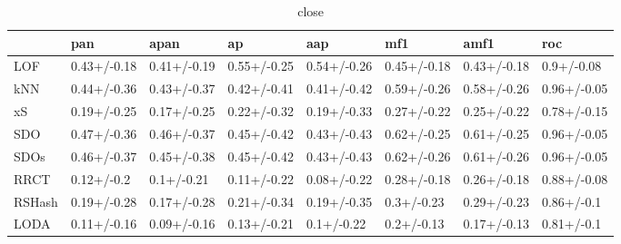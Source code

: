 \begin{table}
\centering
\caption{close}
\begin{tabular}{llllllll}
\toprule
{} &          pan &         apan &           ap &          aap &          mf1 &         amf1 &          roc \\
\midrule
LOF    &  0.43+/-0.18 &  0.41+/-0.19 &  0.55+/-0.25 &  0.54+/-0.26 &  0.45+/-0.18 &  0.43+/-0.18 &   0.9+/-0.08 \\
kNN    &  0.44+/-0.36 &  0.43+/-0.37 &  0.42+/-0.41 &  0.41+/-0.42 &  0.59+/-0.26 &  0.58+/-0.26 &  0.96+/-0.05 \\
xS     &  0.19+/-0.25 &  0.17+/-0.25 &  0.22+/-0.32 &  0.19+/-0.33 &  0.27+/-0.22 &  0.25+/-0.22 &  0.78+/-0.15 \\
SDO    &  0.47+/-0.36 &  0.46+/-0.37 &  0.45+/-0.42 &  0.43+/-0.43 &  0.62+/-0.25 &  0.61+/-0.25 &  0.96+/-0.05 \\
SDOs   &  0.46+/-0.37 &  0.45+/-0.38 &  0.45+/-0.42 &  0.43+/-0.43 &  0.62+/-0.26 &  0.61+/-0.26 &  0.96+/-0.05 \\
RRCT   &   0.12+/-0.2 &   0.1+/-0.21 &  0.11+/-0.22 &  0.08+/-0.22 &  0.28+/-0.18 &  0.26+/-0.18 &  0.88+/-0.08 \\
RSHash &  0.19+/-0.28 &  0.17+/-0.28 &  0.21+/-0.34 &  0.19+/-0.35 &   0.3+/-0.23 &  0.29+/-0.23 &   0.86+/-0.1 \\
LODA   &  0.11+/-0.16 &  0.09+/-0.16 &  0.13+/-0.21 &   0.1+/-0.22 &   0.2+/-0.13 &  0.17+/-0.13 &   0.81+/-0.1 \\
\bottomrule
\end{tabular}
\end{table}
